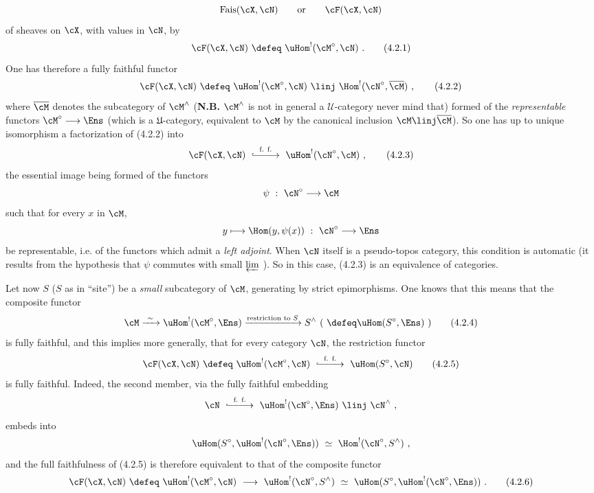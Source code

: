 \[
\mathrm{Fais}(\cX,\cN) \qquad \text{or} \qquad \cF(\cX,\cN)
\]
of sheaves on $\cX$, with values in $\cN$, by
\[
\cF(\cX,\cN) \ \defeq\ \uHom^{!}(\cM^{\circ},\cN) \ .
\tag*{(4.2.1)}
\]
One has therefore a fully faithful functor
\[
\cF(\cX,\cN) \ \defeq\ \uHom^{!}(\cM^{\circ},\cN) \ \linj\ \Hom^{!}(\cN^{\circ},\overline{\cM}) \ ,
\tag*{(4.2.2)}
\]
where $\overline{\cM}$ denotes the subcategory of $\cM^{\wedge}$ (\textbf{N.B.} $\cM^{\wedge}$ is not in general a $\mathcal{U}$-category never mind that) formed of the \textit{representable} functors $\cM^{\circ}\longrightarrow\Ens$ (which is a $\mathfrak{U}$-category, equivalent to $\cM$ by the canonical inclusion $\cM \linj \overline{\cM}$). So one has up to unique isomorphism a factorization of (4.2.2) into
\[
\cF(\cX,\cN) \ \overset{\text{f. f.}}{\lhook\joinrel\relbar\joinrel\relbar\joinrel\longrightarrow}\ \uHom^{!}(\cN^{\circ},\cM) \ ,
\tag*{(4.2.3)}
\]
the essential image being formed of the functors
\[
\psi \ :\ \cN^{\circ} \longrightarrow \cM
\]
such that for every $x$ in $\cM$,
\[
y \longmapsto \Hom(y,\psi(x)) \ :\ \cN^{\circ} \longrightarrow \Ens
\]
be representable, i.e. of the functors which
admit a \textit{left adjoint}. When $\cN$ itself is a pseudo-topos category, this condition is automatic (it results from the hypothesis that $\psi$ commutes with small $\varprojlim$ ). So in this case, (4.2.3) is an equivalence of categories.

Let now $S$ ($S$ as in ``site'') be a \textit{small} subcategory of $\cM$, generating by strict epimorphisms. One knows that this means that the composite functor
\[
\cM \xrightarrow{\ \sim\ } \uHom^{!}(\cM^{\circ},\Ens) \xrightarrow{\text{restriction to } S} S^{\wedge} \ (\ \defeq \uHom(S^{\circ},\Ens)\ )
\tag*{(4.2.4)}
\]
is fully faithful, and this implies more generally, that for every category $\cN$, the restriction functor
\[
\cF(\cX,\cN) \ \defeq\ \uHom^{!}(\cM^{\circ},\cN) \ \overset{\text{f. f.}}{\lhook\joinrel\relbar\joinrel\relbar\joinrel\longrightarrow}\ \uHom(S^{\circ},\cN)
\tag*{(4.2.5)}
\]
is fully faithful. Indeed, the second member, via the fully faithful embedding
\[
\cN \ \overset{\text{f. f.}}{\lhook\joinrel\relbar\joinrel\relbar\joinrel\longrightarrow}\ \uHom^{!}(\cN^{\circ},\Ens) \ \linj\ \cN^{\wedge} \ ,
\]
embeds into
\[
\uHom(S^{\circ},\uHom^{!}(\cN^{\circ},\Ens)) \ \simeq\ \Hom^{!}(\cN^{\circ},S^{\wedge}) \ ,
\]
and the full faithfulness of (4.2.5) is therefore equivalent to that of the composite functor
\[
\cF(\cX,\cN) \ \defeq\ \uHom^{!}(\cM^{\circ},\cN) \ \longrightarrow\ \uHom^{!}(\cN^{\circ},S^{\wedge}) \ \simeq\ \uHom(S^{\circ},\uHom^{!}(\cN^{\circ},\Ens)) \ .
\tag*{(4.2.6)}
\]

